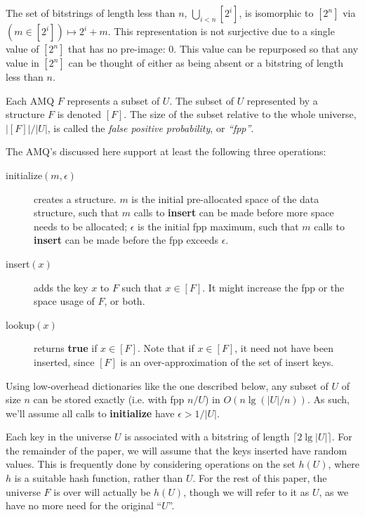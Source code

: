 \documentclass[11pt,letterpaper]{article}
\begin{document}
The set of bitstrings of length less than $n$,  $\bigcup_{i < n} [2^i]$, is isomorphic to $[2^n]$ via $(m \in [2^i]) \mapsto 2^i + m$.
This representation is not surjective due to a single value of $[2^n]$ that has no pre-image: $0$.
This value can be repurposed so that any value in $[2^n]$ can be thought of either as being absent or a bitstring of length less than $n$.

Each AMQ $F$ represents a subset of $U$.
The subset of $U$ represented by a structure $F$ is denoted $[F]$.
The size of the subset relative to the whole universe, $|[F]|/|U|$, is called the {\em false positive probability}, or {\em ``fpp''}.

The AMQ's discussed here support at least the following three operations:

\begin{description}
\item[initialize$(m, \epsilon)$] creates a structure.
  $m$ is the initial pre-allocated space of the data structure, such that $m$ calls to {\bf insert} can be made before more space needs to be allocated;
  $\epsilon$ is the initial fpp maximum, such that $m$ calls to {\bf insert} can be made before the fpp exceeds $\epsilon$.
\item[insert$(x)$] adds the key $x$ to $F$ such that $x \in [F]$.
  It might increase the fpp or the space usage of $F$, or both.
\item[lookup$(x)$] returns {\bf true} if $x \in [F]$.
  Note that if $x \in [F]$, it need not have been inserted, since $[F]$ is an over-approximation of the set of insert keys.
\end{description}

Using low-overhead dictionaries like the one described below, any subset of $U$ of size $n$ can be stored exactly (i.e. with fpp $n/U$) in $O(n \lg (|U|/n))$.
As such, we'll assume all calls to {\bf initialize} have $\epsilon > 1/|U|$.

Each key in the universe $U$ is associated with a bitstring of length $\lceil 2 \lg |U| \rceil$.
For the remainder of the paper, we will assume that the keys inserted have random values.
This is frequently done by considering operations on the set $h(U)$, where $h$ is a suitable hash function, rather than $U$.
For the rest of this paper, the universe $F$ is over will actually be $h(U)$, though we will refer to it as $U$, as we have no more need for the original ``$U$''.
\end{document}
